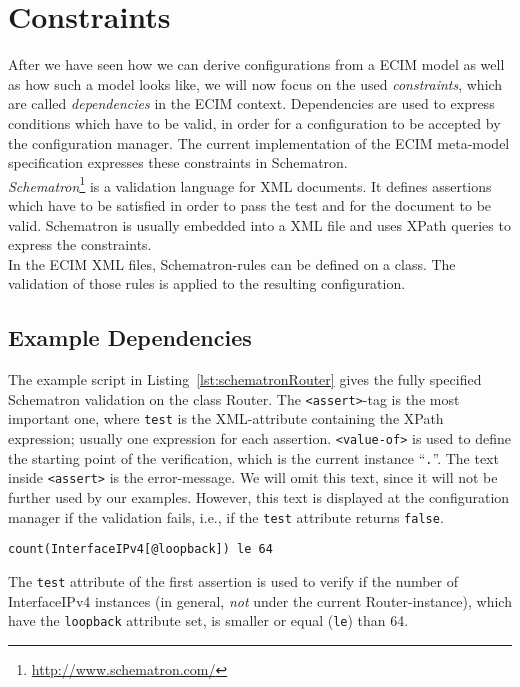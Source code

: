 \chapter{Constraints}\label{chap:constraints}


After we have seen how we can derive configurations from a ECIM model as well as how such a model looks like, we will now focus on the used \emph{constraints}, which are called \emph{dependencies} in the ECIM context. Dependencies are used to express conditions which have to be valid, in order for a configuration to be accepted by the configuration manager. The current implementation of the ECIM meta-model specification expresses these constraints in Schematron.\\

\emph{Schematron}\footnote{\url{http://www.schematron.com/}} is a validation language for XML documents. It defines assertions which have to be satisfied in order to pass the test and for the document to be valid. Schematron is usually embedded into a XML file and uses XPath queries to express the constraints.\\

In the ECIM XML files, Schematron-rules can be defined on a class. The validation of those rules is applied to the resulting configuration. 

\section{Example Dependencies}\label{sec:exampleDep}


The example script in Listing~\ref{lst:schematronRouter} gives the fully specified Schematron validation on the class \textsf{Router}. The \verb|<assert>|-tag is the most important one, where \verb|test| is the XML-attribute containing the XPath expression; usually one expression for each assertion. \verb|<value-of>| is used to define the starting point of the verification, which is the current instance ``\verb|.|''. The text inside \verb|<assert>| is the error-message. We will omit this text, since it will not be further used by our examples. However, this text is displayed at the configuration manager if the validation fails, i.e., if the \verb|test| attribute returns \verb|false|.\\

\begin{verbatim}
count(InterfaceIPv4[@loopback]) le 64
\end{verbatim}
The \verb|test| attribute of the first assertion is used to verify if the number of \textsf{InterfaceIPv4} instances (in general, \emph{not} under the current \textsf{Router}-instance), which have the \verb|loopback| attribute set, is smaller or equal (\verb|le|) than 64.\\

